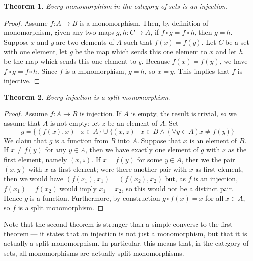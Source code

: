 \documentclass[12pt]{article}
\newtheorem{theorem}{Theorem}
\begin{document}
\begin{theorem}
Every monomorphism in the category of sets is an injection.
\end{theorem}

\begin{proof}
Assume $f \colon A \to B$ is a monomorphism.  Then, by definition of monomorphism,
given any two maps $g,h \colon C \to A$, if $f \circ g = f \circ h$, then $g = h$.
Suppose $x$ and $y$ are two elements of $A$ such that $f(x) = f(y)$.  Let $C$ be 
a set with one element, let $g$ be the map which sends this one element to $x$ and
let $h$ be the map which sends this one element to $y$.  Because $f(x) = f(y)$, we
have $f \circ g = f \circ h$.  Since $f$ is a monomorphism, $g = h$, so $x = y$.
This implies that $f$ is injective.
\end{proof}

\begin{theorem}
Every injection is a split monomorphism.
\end{theorem}

\begin{proof}
Assume $f \colon A \to B$ is injection.  If $A$ is empty, the result is 
trivial, so we assume that $A$ is not empty; let $z$ be an element of $A$.
Set
\[
g = \{ (f(x),x) \mid x \in A \} \cup
\{(x,z) \mid x \in B \land (\forall y \in A) x \neq f(y)\}
\]
We claim that $g$ is a function from $B$ into $A$.  Suppose that $x$ is 
an element of $B$.  If $x \neq f(y)$ for any $y \in A$, then we have exactly
one element of $g$ with $x$ as the first element, namely $(x,z)$.  If $x = 
f(y)$ for some $y \in A$, then we the pair $(x,y)$ with $x$ as first element;
were there another pair with $x$ as first element, then we would have 
$(f(x_1),x_1) = (f(x_2),x_2)$ but, as $f$ is an injection, $f(x_1) = f(x_2)$
would imply $x_1 = x_2$, so this would not be a distinct pair.  Hence $g$ is
a function.  Furthermore, by construction $g \circ f (x) = x$ for all $x \in A$,
so $f$ is a split monomorphism.
\end{proof}

Note that the second theorem is stronger than a simple converse to the first
theorem --- it states that an injection is not just a monomorphism, but that
it is actually a split monomorphism.  In particular, this means that, in the
category of sets, all monomorphisms are actually split monomorphisms.
\end{document}
